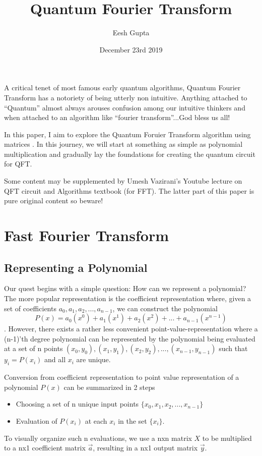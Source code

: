 \documentclass{article}
\title{Quantum Fourier Transform}
\author{Eesh Gupta }
\date{December 23rd 2019}
\begin{document}
\maketitle
  A critical tenet of most famous early quantum algorithms, Quantum Fourier Transform
  has a notoriety of being utterly non intuitive. Anything attached to ``Quantum''
  almost always arouses confusion among our intuitive thinkers and when attached to
  an algorithm like ``fourier transform''...God bless us all!

  In this paper, I aim to explore the Quantum Foruier Transform algorithm
  using matrices
  . In this journey, we will start at something as simple as polynomial
  multiplication and gradually lay the foundations for creating the quantum circuit
  for QFT.

  Some content may be supplemented by Umesh Vazirani's Youtube lecture on QFT circuit
  and Algorithms textbook (for FFT). The latter part of this paper is pure original
  content so beware!
  \section{Fast Fourier Transform}
    \subsection{Representing a Polynomial}
      Our quest begins with a simple question: How can we represent a polynomial?
      The more popular representation is the coefficient representation where,
      given a  set of coefficients \({a_0, a_1, a_2, ... , a_{n-1}}\), we can
      construct the polynomial
      \[P(x) = a_0(x^0) + a_1(x^1) + a_2(x^2) + ... +a_{n-1}(x^{n-1})\].
      However, there exists a rather less convenient point-value-representation
      where a (n-1)'th degree polynomial can be represented by the polynomial being
      evaluated at a set of n points
      \({(x_0, y_0), (x_1, y_1), (x_2, y_2), ... , (x_{n-1}, y_{n-1})}\) such
      that \(y_i = P(x_i)\) and all \(x_i\) are unique.

      Conversion from coefficient representation to point value
      representation of a polynomial \(P(x)\) can be summarized in 2 steps
      \begin{itemize}
        \item Choosing a set of n unique input points
        \(\{x_0, x_1, x_2, ... , x_{n-1}\}\)
        \item Evaluation of \(P(x_i)\) at each \(x_i\) in the set \(\{x_i\}\).
      \end{itemize}
      To visually organize such n evaluations, we use a nxn matrix \(X\) to be
      multiplied to a nx1 coefficient matrix \(\vec{a}\), resulting in a nx1 output matrix
      \(\vec{y}\).
\end{document}
